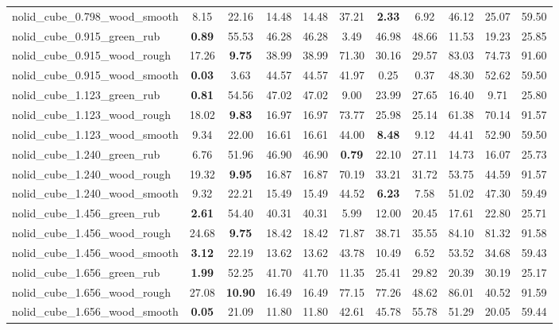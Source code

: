 \begin{table}[H]
{\begin{tabular}{l cccccccccc}
        nolid\_cube\_0.798\_wood\_smooth & 8.15 & 22.16 & 14.48 & 14.48 & 37.21 & \textbf{2.33} & 6.92 & 46.12 & 25.07 & 59.50 \\
        nolid\_cube\_0.915\_green\_rub & \textbf{0.89} & 55.53 & 46.28 & 46.28 & 3.49 & 46.98 & 48.66 & 11.53 & 19.23 & 25.85 \\
        nolid\_cube\_0.915\_wood\_rough & 17.26 & \textbf{9.75} & 38.99 & 38.99 & 71.30 & 30.16 & 29.57 & 83.03 & 74.73 & 91.60 \\
        nolid\_cube\_0.915\_wood\_smooth & \textbf{0.03} & 3.63 & 44.57 & 44.57 & 41.97 & 0.25 & 0.37 & 48.30 & 52.62 & 59.50 \\
        nolid\_cube\_1.123\_green\_rub & \textbf{0.81} & 54.56 & 47.02 & 47.02 & 9.00 & 23.99 & 27.65 & 16.40 & 9.71 & 25.80 \\
        nolid\_cube\_1.123\_wood\_rough & 18.02 & \textbf{9.83} & 16.97 & 16.97 & 73.77 & 25.98 & 25.14 & 61.38 & 70.14 & 91.57 \\
        nolid\_cube\_1.123\_wood\_smooth & 9.34 & 22.00 & 16.61 & 16.61 & 44.00 & \textbf{8.48} & 9.12 & 44.41 & 52.90 & 59.50 \\
        nolid\_cube\_1.240\_green\_rub & 6.76 & 51.96 & 46.90 & 46.90 & \textbf{0.79} & 22.10 & 27.11 & 14.73 & 16.07 & 25.73 \\
        nolid\_cube\_1.240\_wood\_rough & 19.32 & \textbf{9.95} & 16.87 & 16.87 & 70.19 & 33.21 & 31.72 & 53.75 & 44.59 & 91.57 \\
        nolid\_cube\_1.240\_wood\_smooth & 9.32 & 22.21 & 15.49 & 15.49 & 44.52 & \textbf{6.23} & 7.58 & 51.02 & 47.30 & 59.49 \\
        nolid\_cube\_1.456\_green\_rub & \textbf{2.61} & 54.40 & 40.31 & 40.31 & 5.99 & 12.00 & 20.45 & 17.61 & 22.80 & 25.71 \\
        nolid\_cube\_1.456\_wood\_rough & 24.68 & \textbf{9.75} & 18.42 & 18.42 & 71.87 & 38.71 & 35.55 & 84.10 & 81.32 & 91.58 \\
        nolid\_cube\_1.456\_wood\_smooth & \textbf{3.12} & 22.19 & 13.62 & 13.62 & 43.78 & 10.49 & 6.52 & 53.52 & 34.68 & 59.43 \\
        nolid\_cube\_1.656\_green\_rub & \textbf{1.99} & 52.25 & 41.70 & 41.70 & 11.35 & 25.41 & 29.82 & 20.39 & 30.19 & 25.17 \\
        nolid\_cube\_1.656\_wood\_rough & 27.08 & \textbf{10.90} & 16.49 & 16.49 & 77.15 & 77.26 & 48.62 & 86.01 & 40.52 & 91.59 \\
        nolid\_cube\_1.656\_wood\_smooth & \textbf{0.05} & 21.09 & 11.80 & 11.80 & 42.61 & 45.78 & 55.78 & 51.29 & 20.05 & 59.44 \\

\end{tabular}}
\end{table}
